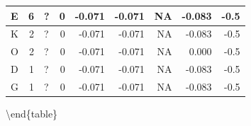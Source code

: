 \documentclass[
  letterpaper,
  DIV=11,
  numbers=noendperiod]{scrreprt}
\begin{document}
\begin{tabular}[t]{l|r|l|r|r|r|r|r|r}
\hline
\hspace{1em}E & 6 & ? & 0 & -0.071 & -0.071 & NA & -0.083 & -0.5\\
\hline
\hspace{1em}K & 2 & ? & 0 & -0.071 & -0.071 & NA & -0.083 & -0.5\\
\hline
\hspace{1em}O & 2 & ? & 0 & -0.071 & -0.071 & NA & 0.000 & -0.5\\
\hline
\hspace{1em}D & 1 & ? & 0 & -0.071 & -0.071 & NA & -0.083 & -0.5\\
\hline
\hspace{1em}G & 1 & ? & 0 & -0.071 & -0.071 & NA & -0.083 & -0.5\\
\hline
\end{tabular}

\textbackslash end\{table\}
\end{document}
